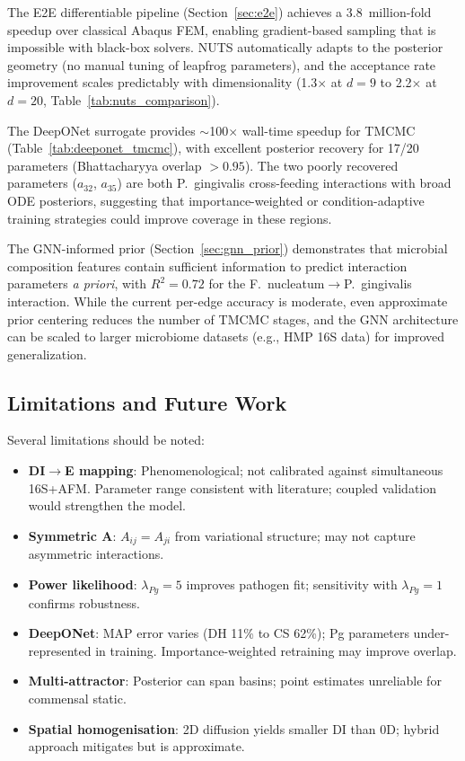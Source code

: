 \documentclass[11pt,a4paper]{article}
\begin{document}
The E2E differentiable pipeline (Section~\ref{sec:e2e}) achieves a 3.8~million-fold speedup over classical Abaqus FEM, enabling gradient-based sampling that is impossible with black-box solvers. NUTS automatically adapts to the posterior geometry (no manual tuning of leapfrog parameters), and the acceptance rate improvement scales predictably with dimensionality (1.3$\times$ at $d=9$ to 2.2$\times$ at $d=20$, Table~\ref{tab:nuts_comparison}).

The DeepONet surrogate provides $\sim$100$\times$ wall-time speedup for TMCMC (Table~\ref{tab:deeponet_tmcmc}), with excellent posterior recovery for 17/20 parameters (Bhattacharyya overlap $> 0.95$). The two poorly recovered parameters ($a_{32}$, $a_{35}$) are both P.~gingivalis cross-feeding interactions with broad ODE posteriors, suggesting that importance-weighted or condition-adaptive training strategies could improve coverage in these regions.

The GNN-informed prior (Section~\ref{sec:gnn_prior}) demonstrates that microbial composition features contain sufficient information to predict interaction parameters \textit{a priori}, with $R^2 = 0.72$ for the F.~nucleatum$\to$P.~gingivalis interaction. While the current per-edge accuracy is moderate, even approximate prior centering reduces the number of TMCMC stages, and the GNN architecture can be scaled to larger microbiome datasets (e.g., HMP 16S data) for improved generalization.

\subsection{Limitations and Future Work}

Several limitations should be noted:

\begin{itemize}
  \item \textbf{DI$\to$E mapping}: Phenomenological; not calibrated against simultaneous 16S+AFM. Parameter range consistent with literature; coupled validation would strengthen the model.
  \item \textbf{Symmetric $\mathbf{A}$}: $A_{ij} = A_{ji}$ from variational structure; may not capture asymmetric interactions.
  \item \textbf{Power likelihood}: $\lambda_{Pg} = 5$ improves pathogen fit; sensitivity with $\lambda_{Pg} = 1$ confirms robustness.
  \item \textbf{DeepONet}: MAP error varies (DH 11\% to CS 62\%); Pg parameters under-represented in training. Importance-weighted retraining may improve overlap.
  \item \textbf{Multi-attractor}: Posterior can span basins; point estimates unreliable for commensal static.
  \item \textbf{Spatial homogenisation}: 2D diffusion yields smaller DI than 0D; hybrid approach mitigates but is approximate.
\end{itemize}
\end{document}
